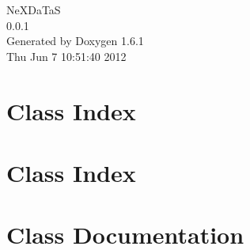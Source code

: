 \documentclass[a4paper]{book}
\begin{document}
\hypersetup{pageanchor=false}
\begin{titlepage}
\vspace*{7cm}
\begin{center}
{\Large NeXDaTaS \\[1ex]\large 0.0.1 }\\
\vspace*{1cm}
{\large Generated by Doxygen 1.6.1}\\
\vspace*{0.5cm}
{\small Thu Jun 7 10:51:40 2012}\\
\end{center}
\end{titlepage}
\clearemptydoublepage
{}
\tableofcontents
\clearemptydoublepage
{}
\hypersetup{pageanchor=true}
\chapter{Class Index}

\chapter{Class Index}

\chapter{Class Documentation}





























\printindex
\end{document}
